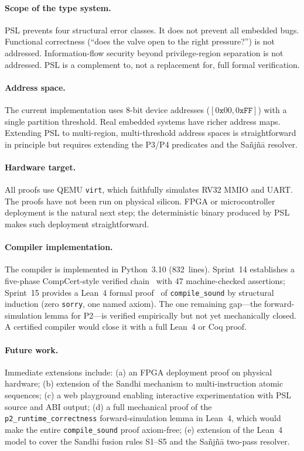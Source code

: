 \documentclass[11pt,a4paper]{article}
\begin{document}
\paragraph{Scope of the type system.}
PSL prevents four structural error classes. It does not prevent all embedded
bugs. Functional correctness (``does the valve open to the right pressure?'')
is not addressed. Information-flow security beyond privilege-region separation
is not addressed. PSL is a complement to, not a replacement for, full formal
verification.

\paragraph{Address space.}
The current implementation uses 8-bit device addresses ($[0\texttt{x}00,
0\texttt{xFF}]$) with a single partition threshold. Real embedded systems have
richer address maps. Extending PSL to multi-region, multi-threshold address
spaces is straightforward in principle but requires extending the
P3/P4 predicates and the Sa\~{n}j\~{n}\={a} resolver.

\paragraph{Hardware target.}
All proofs use QEMU \texttt{virt}, which faithfully simulates RV32 MMIO and
UART. The proofs have not been run on physical silicon. FPGA or
microcontroller deployment is the natural next step; the deterministic
binary produced by PSL makes such deployment straightforward.

\paragraph{Compiler implementation.}
\begin{sloppypar}
The compiler is implemented in Python~3.10 (832~lines).
Sprint~14 establishes a five-phase CompCert-style verified
chain~\cite{leroy2009compcert} with 47 machine-checked assertions;
Sprint~15 provides a Lean~4 formal proof~\cite{moura2021lean4} of
\texttt{compile\_sound} by structural induction (zero \texttt{sorry},
one named axiom). The one remaining gap---the forward-simulation lemma
for P2---is verified empirically but not yet mechanically closed.
A certified compiler would close it with a full Lean~4 or Coq proof.
\end{sloppypar}

\paragraph{Future work.}
Immediate extensions include: (a) an FPGA deployment proof on physical
hardware; (b) extension of the Sandhi mechanism to multi-instruction atomic
sequences; (c) a web playground enabling interactive experimentation with PSL
source and ABI output; (d) a full mechanical proof of the
\texttt{p2\_runtime\_correctness} forward-simulation lemma in Lean~4, which
would make the entire \texttt{compile\_sound} proof axiom-free; (e) extension
of the Lean~4 model to cover the Sandhi fusion rules S1--S5 and the
Sa\~{n}j\~{n}\={a} two-pass resolver.
\end{document}
